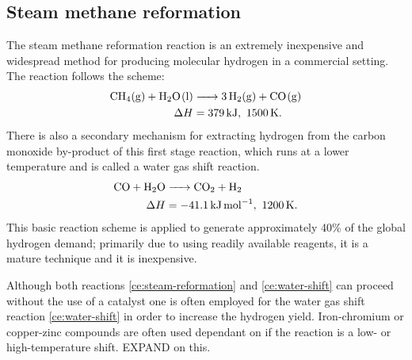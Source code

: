 \subsection{Steam methane reformation}%
\label{sub:steam_methane_reformation}

The steam methane reformation reaction is an extremely inexpensive and widespread method for producing molecular hydrogen in a commercial setting.
The reaction follows the scheme\cite{Saxena2011}:
\begin{align}
	\ce{CH4(g) + H2O(l) &-> 3H2(g) + CO(g)} \label{ce:steam-reformation}\\
	\Delta H &= \SI{379}{\kilo\joule},\ \SI{1500}{K} \nonumber
.\end{align}
There is also a secondary mechanism for extracting hydrogen from the carbon monoxide by-product of this first stage reaction, which runs at a lower temperature and is called a water gas shift reaction\cite{Chen2008,Saxena2011}.
\begin{align}
	\ce{CO + H2O &-> CO2 + H2}\label{ce:water-shift} \\
	\Delta H &= \SI{-41.1}{\kilo\joule\per\mole},\ \SI{1200}{K} \nonumber
.\end{align}
This basic reaction scheme is applied to generate approximately 40\% of the global hydrogen demand\cite{SBN2020}; primarily due to using readily available reagents, it is a mature technique and it is inexpensive.

Although both reactions \eqref{ce:steam-reformation} and \eqref{ce:water-shift} can proceed without the use of a catalyst one is often employed for the water gas shift reaction \eqref{ce:water-shift} in order to increase the hydrogen yield.
Iron-chromium or copper-zinc compounds are often used dependant on if the reaction is a low- or high-temperature shift. EXPAND on this.
